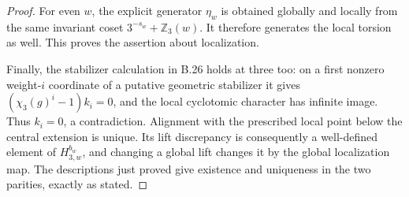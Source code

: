 \begin{proof}
For even $w$, the explicit generator $\eta_w$
is obtained globally and locally from the same
invariant coset $3^{-s_w}+\mathbb Z_3(w)$.
It therefore generates the local torsion as well.
This proves the assertion about localization.

Finally, the stabilizer calculation in B.26 holds
at three too: on a first nonzero weight-$i$ coordinate
of a putative geometric stabilizer it gives
$(\chi_3(g)^i-1)k_i=0$, and the local cyclotomic
character has infinite image. Thus $k_i=0$, a
contradiction. Alignment with the prescribed local
point below the central extension is unique.
Its lift discrepancy is consequently a well-defined
element of $H_{3,w}^{b_w}$, and changing a global
lift changes it by the global localization map.
The descriptions just proved give existence and
uniqueness in the two parities, exactly as stated.
\end{proof}
